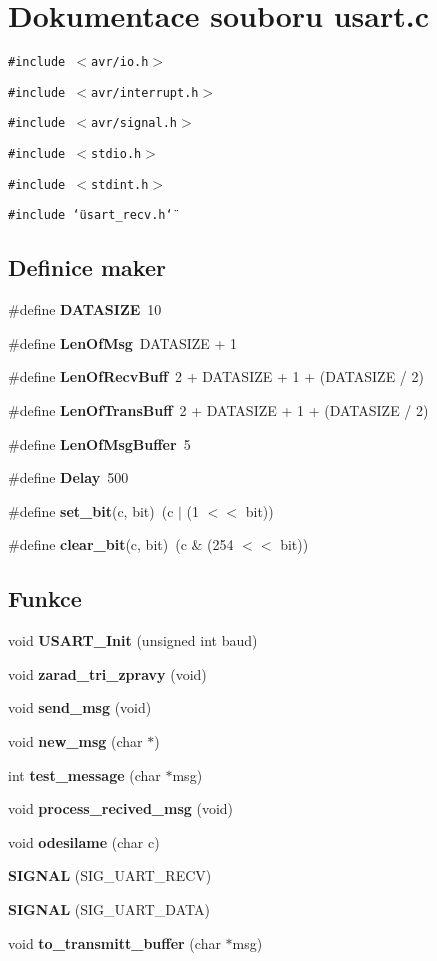 \section{Dokumentace souboru usart.c}
\label{usart_8c}
{\tt \#include $<$avr/io.h$>$}\par
{\tt \#include $<$avr/interrupt.h$>$}\par
{\tt \#include $<$avr/signal.h$>$}\par
{\tt \#include $<$stdio.h$>$}\par
{\tt \#include $<$stdint.h$>$}\par
{\tt \#include \char`\"{}usart\_\-recv.h\char`\"{}}\par
\subsection*{Definice maker}
\begin{CompactItemize}
\item 
\#define {\bf DATASIZE}~10
\item 
\#define {\bf LenOfMsg}~DATASIZE + 1
\item 
\#define {\bf LenOfRecvBuff}~2 + DATASIZE + 1 + (DATASIZE / 2)
\item 
\#define {\bf LenOfTransBuff}~2 + DATASIZE + 1 + (DATASIZE / 2)
\item 
\#define {\bf LenOfMsgBuffer}~5
\item 
\#define {\bf Delay}~500
\item 
\#define {\bf set\_\-bit}(c, bit)~(c $|$ (1 $<$$<$ bit))
\item 
\#define {\bf clear\_\-bit}(c, bit)~(c \& (254 $<$$<$ bit))
\end{CompactItemize}
\subsection*{Funkce}
\begin{CompactItemize}
\item 
void {\bf USART\_\-Init} (unsigned int baud)
\item 
void {\bf zarad\_\-tri\_\-zpravy} (void)
\item 
void {\bf send\_\-msg} (void)
\item 
void {\bf new\_\-msg} (char $\ast$)
\item 
int {\bf test\_\-message} (char $\ast$msg)
\item 
void {\bf process\_\-recived\_\-msg} (void)
\item 
void {\bf odesilame} (char c)
\item 
{\bf SIGNAL} (SIG\_\-UART\_\-RECV)
\item 
{\bf SIGNAL} (SIG\_\-UART\_\-DATA)
\item 
void {\bf to\_\-transmitt\_\-buffer} (char $\ast$msg)
\end{CompactItemize}
